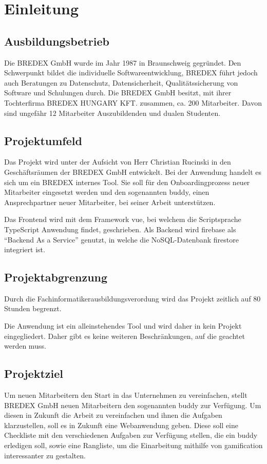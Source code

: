 \documentclass[11pt]{article}
\begin{document}
%
%
                    
\section{Einleitung}
                    
\subsection{Ausbildungsbetrieb}
Die BREDEX GmbH wurde im Jahr 1987 in Braunschweig gegründet. Den Schwerpunkt 
bildet die individuelle Softwareentwicklung, BREDEX führt jedoch auch 
Beratungen zu Datenschutz, Datensicherheit, Qualitätssicherung von Software 
und Schulungen durch. Die BREDEX GmbH besitzt, mit ihrer Tochterfirma BREDEX 
HUNGARY KFT. zusammen, ca. 200 Mitarbeiter. Davon sind ungefähr 12 Mitarbeiter Auszubildenden und dualen Studenten.  %

\subsection{Projektumfeld}
Das Projekt wird unter der Aufsicht von Herr Christian Rucinski in den 
Geschäftsräumen der BREDEX GmbH entwickelt. Bei der Anwendung handelt es sich 
um ein BREDEX internes Tool. Sie soll für den Onboardingprozess neuer Mitarbeiter 
eingesetzt werden und den sogenannten \Gls{buddy}, einen Ansprechpartner 
neuer Mitarbeiter, bei seiner Arbeit unterstützen. 

Das Frontend wird mit dem Framework \Gls{vue}, bei welchem die Scriptsprache TypeScript 
Anwendung findet, geschrieben. Als Backend wird \gls{firebase} als “Backend As a Service” 
genutzt, in welche die NoSQL-Datenbank \gls{firestore} integriert ist.

\subsection{Projektabgrenzung}
Durch die Fachinformatikerausbildungsverordung wird das Projekt zeitlich auf 80 
Stunden begrenzt.  

Die Anwendung ist ein alleinstehendes Tool und wird daher in kein Projekt 
eingegliedert. Daher gibt es keine weiteren Beschränkungen, auf die geachtet 
werden muss.  

\subsection{Projektziel}
Um neuen Mitarbeitern den Start in das Unternehmen zu vereinfachen, stellt BREDEX GmbH neuen Mitarbeitern
den sogenannten \gls{buddy} zur Verfügung. Um diesen in Zukunft die Arbeit zu vereinfachen und ihnen die Aufgaben klarzustellen,
soll es in Zukunft eine Webanwendung geben. Diese soll eine Checkliste mit den verschiedenen Aufgaben zur Verfügung stellen, die ein
\Gls{buddy} erledigen soll, sowie eine Rangliste, um die Einarbeitung mithilfe von \Gls{gamification} interessanter zu gestalten.
\end{document}
